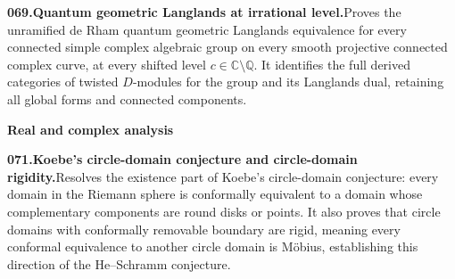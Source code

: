 \documentclass[11pt,a4paper]{article}
\begin{document}
  \par \begin{minipage}{\linewidth}
  \fontsize{10.5}{12.6}\selectfont\RaggedRight
  \hypertarget{result 069}{}
  {\bfseries\textcolor{muted}{069.}\enspace Quantum geometric Langlands at irrational level.}\enspace Proves the unramified de Rham quantum geometric Langlands equivalence for every connected simple complex algebraic group on every smooth projective connected complex curve, at every shifted level $c\in\mathbb C\setminus\mathbb Q$. It identifies the full derived categories of twisted $D$-modules for the group and its Langlands dual, retaining all global forms and connected components.\par
  \end{minipage}\par\vspace{5pt}



  \par{}\addvspace{12pt}
  \hypertarget{subject 10}{}\label{subject 10}
  {\fontsize{15}{18}\selectfont\bfseries Real and complex analysis\par}
  \nobreak\vspace{9pt}\nobreak



  \par \begin{minipage}{\linewidth}
  \fontsize{10.5}{12.6}\selectfont\RaggedRight
  \hypertarget{result 071}{}
  {\bfseries\textcolor{muted}{071.}\enspace Koebe's circle-domain conjecture and circle-domain rigidity.}\enspace Resolves the existence part of Koebe's circle-domain conjecture: every domain in the Riemann sphere is conformally equivalent to a domain whose complementary components are round disks or points. It also proves that circle domains with conformally removable boundary are rigid, meaning every conformal equivalence to another circle domain is M\"obius, establishing this direction of the He--Schramm conjecture.\par
  \end{minipage}\par\vspace{5pt}
\end{document}
